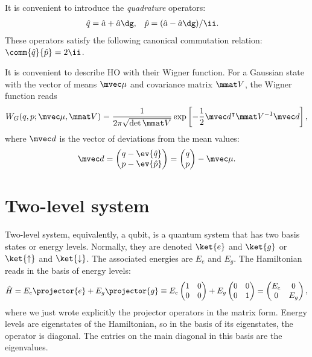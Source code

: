 \documentclass[fontsize=9pt,twoside=semi,bookmarkpackage=false]{scrartcl}
\begin{document}
It is convenient to introduce the \emph{quadrature} operators:
\begin{align}
  \hat q & = \hat a + \hat a\dg, &
  \hat p & = ( \hat a - \hat a\dg ) / \ii.
\end{align}
These operators satisfy the following canonical commutation relation: $\comm{ \hat q }{ \hat p } = 2 \ii$.

It is convenient to describe HO with their Wigner function.
For a Gaussian state with the vector of means $\mvec \mu$ and covariance matrix $\mmat V$, the Wigner function reads
\begin{equation}
  W_G ( q , p ; \mvec \mu, \mmat V )
  =
  \frac{ 1 }{ 2 \pi \sqrt{ \det \mmat V }}
  \exp\left[
    - \frac 12 \mvec d^\intercal \mmat V^{-1}  \mvec d
  \right],
\end{equation}
where $\mvec d$ is the vector of deviations from the mean values:
\begin{equation}
  \mvec d
  =
  \begin{pmatrix}
    q - \ev{ \hat q } \\ p - \ev{ \hat p }
  \end{pmatrix}
  =
  \begin{pmatrix}
    q \\ p
  \end{pmatrix}- \mvec \mu.
\end{equation}

\section{Two-level system} %
\label{sec:two_level_system}

Two-level system, equivalently, a qubit, is a quantum system that has two basis states or energy levels.
Normally, they are denoted $\ket{e}$ and $\ket{g}$ or $\ket{\uparrow}$ and $\ket{\downarrow}$.
The associated energies are $E_e$ and $E_g$.
The Hamiltonian reads in the basis of energy levels:
\begin{equation}
  \hat H = E_e \projector{e} + E_g \projector{g}
  \equiv
  E_e
  \begin{pmatrix}
    1 & 0 \\ 0 & 0
  \end{pmatrix}
  +
  E_g
  \begin{pmatrix}
    0 & 0 \\ 0 & 1
  \end{pmatrix}
  =
  \begin{pmatrix}
    E_e & 0 \\ 0 & E_g
  \end{pmatrix}
  ,
\end{equation}
where we just wrote explicitly the projector operators in the matrix form.
Energy levels are eigenstates of the Hamiltonian, so in the basis of its eigenstates, the operator is diagonal.
The entries on the main diagonal in this basis are the eigenvalues.
\end{document}
